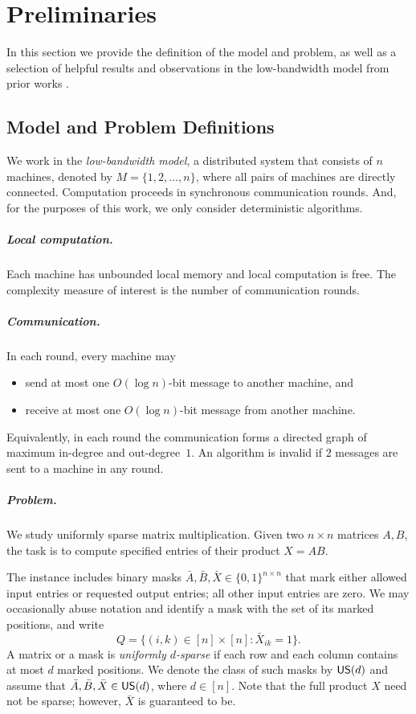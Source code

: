 \section{Preliminaries} \label{sec:prelim}
In this section we provide the definition of the model and problem, as well as a selection of helpful results and observations in the low-bandwidth model from prior works \cite{gupta-hirvonen-etal-2022-sparse-matrix-multiplication, gupta-korhonen-etal-2025-low-bandwidth-matrix, gupta-suomela-vahidi-2026-rectangular-matrix}.

\subsection{Model and Problem Definitions} \label{subsec:definitions}

We work in the \emph{low-bandwidth model}, a distributed system that consists of $n$ machines, denoted by
$M = \{1,2,\dots,n\}$, where all pairs of machines are directly connected.
Computation proceeds in synchronous communication rounds. And, for the purposes of this work, we only consider deterministic algorithms.

\subparagraph{Local computation.}
Each machine has unbounded local memory and local computation is free. The complexity measure of interest is the number of communication rounds.

\subparagraph{Communication.}
In each round, every machine may
\begin{itemize}
	\item send at most one $O(\log n)$-bit message to another machine, and
	\item receive at most one $O(\log n)$-bit message from another machine.
\end{itemize}
Equivalently, in each round the communication forms a directed graph of maximum in-degree and out-degree~$1$. An algorithm is invalid if $2$ messages are sent to a machine in any round.

\subparagraph{Problem.}
We study uniformly sparse matrix multiplication. Given two $n\times n$ matrices $A,B$, the task is to compute specified entries of their product $X=AB$.

The instance includes binary masks $\bar{A},\bar{B},\bar{X}\in\{0,1\}^{n\times n}$ that mark either allowed input entries or requested output entries; all other input entries are zero.
We may occasionally abuse notation and identify a mask with the set of its marked positions, and write
\[
  Q=\{(i,k)\in[n]\times[n]:\bar{X}_{ik}=1\}.
\]
A matrix or a mask is \emph{uniformly $d$-sparse} if each row and each column contains at most $d$ marked positions.
We denote the class of such masks by $\mathsf{US}(d)$ and assume that $\bar{A},\bar{B},\bar{X}\in\mathsf{US}(d)$, where $d\in[n]$.
Note that the full product $X$ need not be sparse; however, $\bar{X}$ is guaranteed to be.

